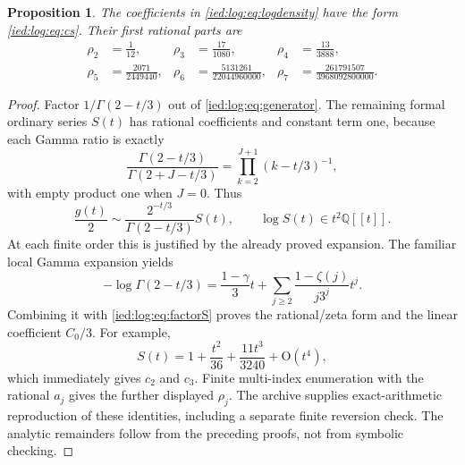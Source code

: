 \documentclass[11pt,letterpaper]{article}
\newtheorem{proposition}[theorem]{Proposition}
\theoremstyle{remark}\newtheorem{remark}[theorem]{Remark}
\newcommand{\Oh}{\mathrm O}\newcommand{\supp}{\operatorname{supp}}
\begin{document}
\begin{proposition}\label{ied:log:prop:rhozeta}
The coefficients in \eqref{ied:log:eq:logdensity} have the form \eqref{ied:log:eq:cs}. Their first rational parts are
\begin{align*}
 \rho_2&=\frac1{12},& \rho_3&=\frac{17}{1080},&
 \rho_4&=\frac{13}{3888},\\
 \rho_5&=\frac{2071}{2449440},&
 \rho_6&=\frac{5131261}{22044960000},&
 \rho_7&=\frac{261791507}{3968092800000}.
\end{align*}
\end{proposition}
\begin{proof}
Factor $1/\Gamma(2-t/3)$ out of \eqref{ied:log:eq:generator}. The remaining formal ordinary series $S(t)$ has rational coefficients and constant term one, because each Gamma ratio is exactly
\[
 \frac{\Gamma(2-t/3)}{\Gamma(2+J-t/3)}
       =\prod_{k=2}^{J+1}(k-t/3)^{-1},
\]
with empty product one when $J=0$. Thus
\begin{equation}\label{ied:log:eq:factorS}
 \frac{g(t)}2\sim \frac{2^{-t/3}}{\Gamma(2-t/3)}S(t),
 \qquad \log S(t)\in t^2\mathbb Q[[t]].
\end{equation}
At each finite order this is justified by the already proved expansion. The familiar local Gamma expansion yields
\[
 -\log\Gamma(2-t/3)=\frac{1-\gamma}3t
 +\sum_{j\ge2}\frac{1-\zeta(j)}{j3^j}t^j.
\]
Combining it with \eqref{ied:log:eq:factorS} proves the rational/zeta form and the linear coefficient $C_0/3$. For example,
\[
 S(t)=1+\frac{t^2}{36}+\frac{11t^3}{3240}+\Oh(t^4),
\]
which immediately gives $c_2$ and $c_3$. Finite multi-index enumeration with the rational $a_j$ gives the further displayed $\rho_j$. The archive supplies exact-arithmetic reproduction of these identities, including a separate finite reversion check. The analytic remainders follow from the preceding proofs, not from symbolic checking.
\end{proof}
\end{document}
